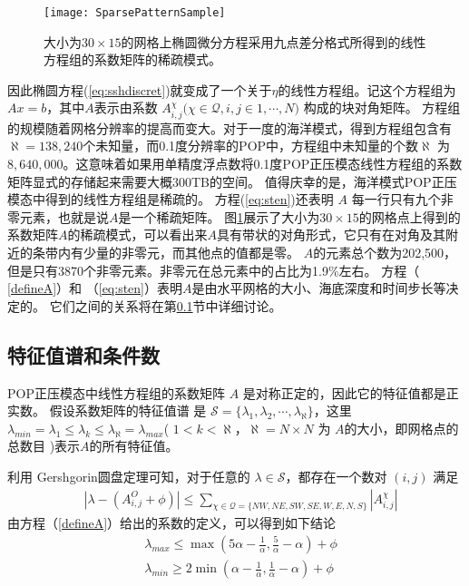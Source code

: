 \begin{figure}
\centering
\texttt{[image: SparsePatternSample]}
\caption[] {大小为$30\times 15$的网格上椭圆微分方程采用九点差分格式所得到的线性方程组的系数矩阵的稀疏模式。 \label{fig:spy}}
\end{figure}
因此椭圆方程(\ref{eq:sshdiscret})就变成了一个关于$\eta$的线性方程组。记这个方程组为 $Ax= b$，其中$A$表示由系数 $A_{i,j}^{\chi } ( \chi \in \mathcal{Q}, i,j \in {1,\cdots, N)}$ 构成的块对角矩阵。
方程组的规模随着网格分辨率的提高而变大。对于一度的海洋模式，得到方程组包含有$\aleph = 138,240$个未知量，而0.1度分辨率的POP中，方程组中未知量的个数$\aleph$ 为$8,640,000$。这意味着如果用单精度浮点数将0.1度POP正压模态线性方程组的系数矩阵显式的存储起来需要大概300TB的空间。
值得庆幸的是，海洋模式POP正压模态中得到的线性方程组是稀疏的。
方程(\ref{eq:sten})还表明 $A$ 每一行只有九个非零元素，也就是说$A$是一个稀疏矩阵。 图\ref{fig:spy}展示了大小为$30\times 15$的网格点上得到的系数矩阵$A$的稀疏模式，可以看出来$A$具有带状的对角形式，它只有在对角及其附近的条带内有少量的非零元，而其他点的值都是零。
$A$的元素总个数为202,500，但是只有3870个非零元素。非零元在总元素中的占比为1.9\%左右。
方程（ \ref{defineA}）和 （\ref{eq:sten}）表明$A$是由水平网格的大小、海底深度和时间步长等决定的。
它们之间的关系将在第\ref{solver:Algorithm:condition}节中详细讨论。

\subsection{特征值谱和条件数}
\label{solver:Algorithm:condition}

POP正压模态中线性方程组的系数矩阵 $A$ 是对称正定的\cite{smith2010parallel}，因此它的特征值都是正实数\cite{stewart1976positive}。
假设系数矩阵的特征值谱\cite{golub2012matrix} 是 $\mathcal{S} = \{\lambda_1, \lambda_2, \cdots, \lambda_\aleph\}$，这里 $\lambda_{min} = \lambda_1 \le \lambda_k \le \lambda_\aleph = \lambda_{max}$( $1<k <\aleph $，$\aleph=N\times N$ 为 $A$的大小，即网格点的总数目 )表示$A$的所有特征值。

利用 Gershgorin圆盘定理\cite{bell1965gershgorin}可知，对于任意的 $\lambda \in \mathcal{S}$，都存在一个数对 $(i,j)$ 满足
\begin{align}
&|\lambda -  (A_{i,j}^O + \phi ) | \le \sum_{\chi \in \mathcal{Q} = \{NW,NE,SW,SE,W,E,N,S\}}|A_{i,j}^\chi|
\end{align}
由方程（\ref{defineA}）给出的系数的定义，可以得到如下结论 
\begin{align} \label{eigsGersh}
&\lambda_{max} \le  \max (  5\alpha - \frac{1}{\alpha}, \frac{5}{\alpha}- \alpha) +\phi   \\
&\lambda_{min} \ge 2\min (  \alpha - \frac{1}{\alpha},\frac{1} {\alpha} -  \alpha) + \phi
\end{align}

